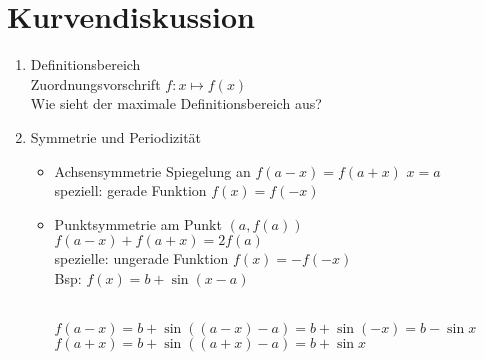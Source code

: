 \documentclass{article}
\begin{document}
\section{Kurvendiskussion}
\begin{enumerate}
 \item Definitionsbereich\\
 Zuordnungsvorschrift $f: x \mapsto f(x)$\\
 Wie sieht der maximale Definitionsbereich aus?
 \item Symmetrie und Periodizität
 \begin{itemize}
  \item Achsensymmetrie Spiegelung an $f(a-x) = f(a+x)$ $x = a$\\
  speziell: gerade Funktion $f(x)=f(-x)$
  \item Punktsymmetrie am Punkt $(a, f(a))$\\
  $f(a-x) + f(a+x) = 2f(a)$\\
  spezielle: ungerade Funktion $f(x)=-f(-x)$\\
  Bsp: $f(x) = b + \sin(x - a)$\\
  \\
  $f(a-x)=b+\sin((a-x)-a)=b+\sin(-x)=b-\sin x$\\
  $f(a+x)=b+\sin((a+x)-a)=b+\sin x$
 \end{itemize}

\end{enumerate}

\end{document}

